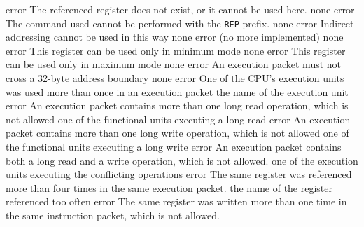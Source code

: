\documentclass[12pt,twoside]{report}
\newcommand{\tty}[1]{{\tt #1}}
\begin{document}
\begin{description}
               {error}
               {The referenced register does not exist, or it cannot
                be used here.}
               {none}
               {error}
               {The command used cannot be performed with the \tty{REP}-prefix.}
               {none}
               {error}
               {Indirect addressing cannot be used in this way}
               {none}
               {error}
               {(no more implemented)}
               {none}
               {error}
               {This register can be used only in minimum mode}
               {none}
               {error}
               {This register can be used only in maximum mode}
               {none}
               {error}
               {An execution packet must not cross a 32-byte address
                boundary}
               {none}
               {error}
               {One of the CPU's execution units was used more than
                once in an execution packet}
               {the name of the execution unit}
               {error}
               {An execution packet contains more than one long read
                operation, which is not allowed}
               {one of the functional units executing a long read}
               {error}
               {An execution packet contains more than one long write
                operation, which is not allowed}
               {one of the functional units executing a long write}
               {error}
               {An execution packet contains both a long read and a write
                operation, which is not allowed.}
               {one of the execution units executing the conflicting
                operations}
               {error}
               {The same register was referenced more than four times in
                the same execution packet.}
               {the name of the register referenced too often}
               {error}
               {The same register was written more than one time in the
                same instruction packet, which is not allowed.}

\end{description}
\end{document}
